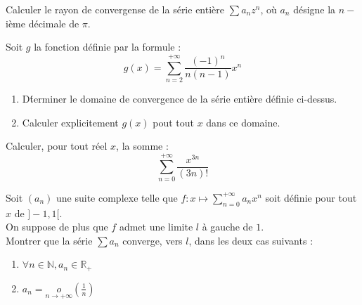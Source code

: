 
\begin{exer}
Calculer le rayon de convergense de la s\'erie enti\`ere $\sum a_n z^n$, o\`u $a_n$ d\'esigne la $n-$i\`eme d\'ecimale de $\pi$.
\end{exer}

\begin{exer}
Soit $g$ la fonction d\'efinie par la formule :\[g(x)=\sum\limits_{n=2}^{+\infty}\frac{(-1)^n}{n(n-1)}x^n\]
\begin{enumerate}
\item D\'terminer le domaine de convergence de la s\'erie enti\`ere d\'efinie ci-dessus.
\item Calculer explicitement $g(x)$ pout tout $x$ dans ce domaine.
\end{enumerate}
\end{exer}

\begin{exer}
Calculer, pour tout r\'eel $x$, la somme : \[\sum\limits_{n=0}^{+\infty}\frac{x^{3n}}{(3n)!}\]
\end{exer}

\begin{exer}
Soit $(a_n)$ une suite complexe telle que $f:x\mapsto\sum\limits_{n=0}^{+\infty}a_nx^n$ soit d\'efinie pour tout $x$ de $]-1,1[$.\\
On suppose de plus que $f$ admet une limite $l$ \`a gauche de $1$.\\
Montrer que la s\'erie $\sum a_n$ converge, vers $l$, dans les deux cas suivants :
\begin{enumerate}
\item $\forall n \in \mathbb{N} , a_n \in \mathbb{R}_+$
\item $a_n = \underset{n\rightarrow +\infty}{o}(\frac{1}{n})$
\end{enumerate}
\end{exer}
